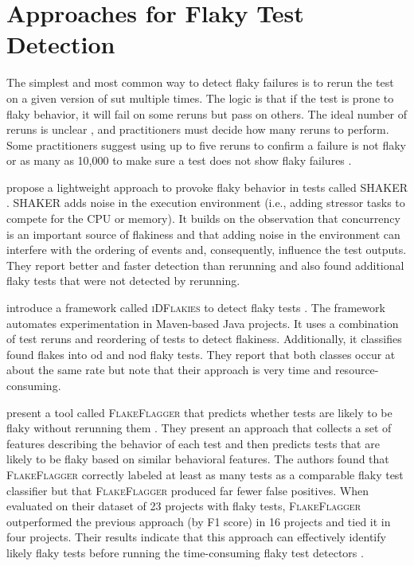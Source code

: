 \section{Approaches for Flaky Test Detection}
The simplest and most common way to detect flaky failures is to rerun the test on a given version of \ac{sut} multiple times.
The logic is that if the test is prone to flaky behavior, it will fail on some reruns but pass on others.
The ideal number of reruns is unclear \autocite{parry_survey_2021}, and practitioners must decide how many reruns to perform.
Some practitioners suggest using up to five reruns to confirm a failure is not flaky or as many as 10,000 to make sure a test does not show flaky failures \autocite{lam_understanding_2020, alshammari_flakeflagger_2021}.

 propose a lightweight approach to provoke flaky behavior in tests called \textsc{SHAKER} \autocite{silva_shake_2020}.
\textsc{SHAKER} adds noise in the execution environment (i.e., adding stressor tasks to compete for the CPU or memory).
It builds on the observation that concurrency is an important source of flakiness and that adding noise in the environment can interfere with the ordering of events and, consequently, influence the test outputs.
They report better and faster detection than rerunning and also found additional flaky tests that were not detected by rerunning.

 introduce a framework called \textsc{iDFlakies} to detect flaky tests \autocite{lam_idflakies_2019}.
The framework automates experimentation in Maven-based Java projects.
It uses a combination of test reruns and reordering of tests to detect flakiness.
Additionally, it classifies found flakes into \ac{od} and \ac{nod} flaky tests.
They report that both classes occur at about the same rate but note that their approach is very time and resource-consuming.

 present a tool called \textsc{FlakeFlagger} that predicts whether tests are likely to be flaky without rerunning them \autocite{alshammari_flakeflagger_2021}.
They present an approach that collects a set of features describing the behavior of each test and then predicts tests that are likely to be flaky based on similar behavioral features.
The authors found that \textsc{FlakeFlagger} correctly labeled at least as many tests as a comparable flaky test classifier but that \textsc{FlakeFlagger} produced far fewer false positives.
When evaluated on their dataset of 23 projects with flaky tests, \textsc{FlakeFlagger} outperformed the previous approach (by F1 score) in 16 projects and tied it in four projects.
Their results indicate that this approach can effectively identify likely flaky tests before running the time-consuming flaky test detectors \autocite{alshammari_flakeflagger_2021}.

